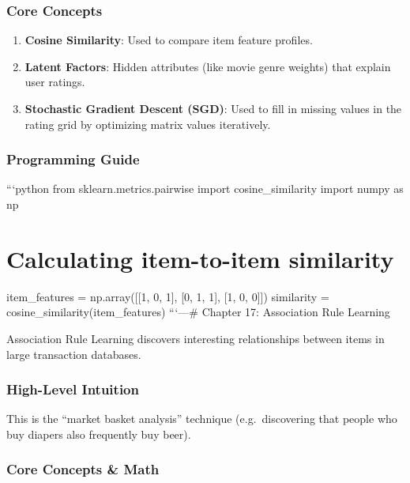 \subsubsection{Core Concepts}\label{core-concepts-9}

\begin{enumerate}
\def\labelenumi{\arabic{enumi}.}
\tightlist
\item
  \textbf{Cosine Similarity}: Used to compare item feature profiles.
\item
  \textbf{Latent Factors}: Hidden attributes (like movie genre weights)
  that explain user ratings.
\item
  \textbf{Stochastic Gradient Descent (SGD)}: Used to fill in missing
  values in the rating grid by optimizing matrix values iteratively.
\end{enumerate}

\subsubsection{Programming Guide}\label{programming-guide-15}

```python from sklearn.metrics.pairwise import cosine\_similarity import
numpy as np

\section{Calculating item-to-item
similarity}\label{calculating-item-to-item-similarity}

item\_features = np.array({[}{[}1, 0, 1{]}, {[}0, 1, 1{]}, {[}1, 0,
0{]}{]}) similarity = cosine\_similarity(item\_features)
```\n\n---\n\n\# Chapter 17: Association Rule Learning

Association Rule Learning discovers interesting relationships between
items in large transaction databases.

\subsubsection{High-Level Intuition}\label{high-level-intuition-16}

This is the ``market basket analysis'' technique (e.g.~discovering that
people who buy diapers also frequently buy beer).

\subsubsection{Core Concepts \& Math}\label{core-concepts-math-2}

